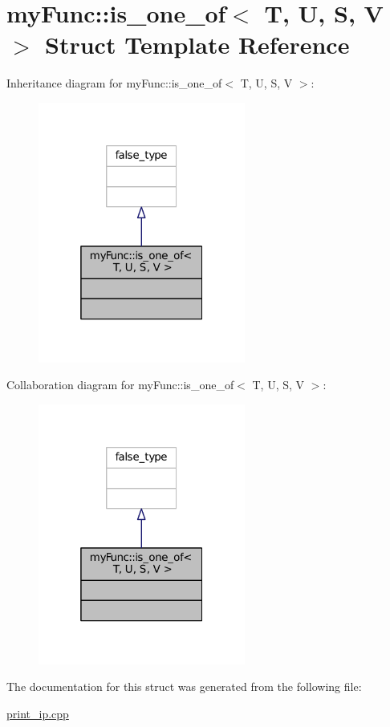 \hypertarget{structmyFunc_1_1is__one__of}{}\section{my\+Func\+:\+:is\+\_\+one\+\_\+of$<$ T, U, S, V $>$ Struct Template Reference}
\label{structmyFunc_1_1is__one__of}


Inheritance diagram for my\+Func\+:\+:is\+\_\+one\+\_\+of$<$ T, U, S, V $>$\+:
\nopagebreak
\begin{figure}[H]
\begin{center}
\leavevmode
\includegraphics[width=193pt]{structmyFunc_1_1is__one__of__inherit__graph}
\end{center}
\end{figure}


Collaboration diagram for my\+Func\+:\+:is\+\_\+one\+\_\+of$<$ T, U, S, V $>$\+:
\nopagebreak
\begin{figure}[H]
\begin{center}
\leavevmode
\includegraphics[width=193pt]{structmyFunc_1_1is__one__of__coll__graph}
\end{center}
\end{figure}


The documentation for this struct was generated from the following file\+:\begin{DoxyCompactItemize}
\item 
\hyperlink{print__ip_8cpp}{print\+\_\+ip.\+cpp}\end{DoxyCompactItemize}
